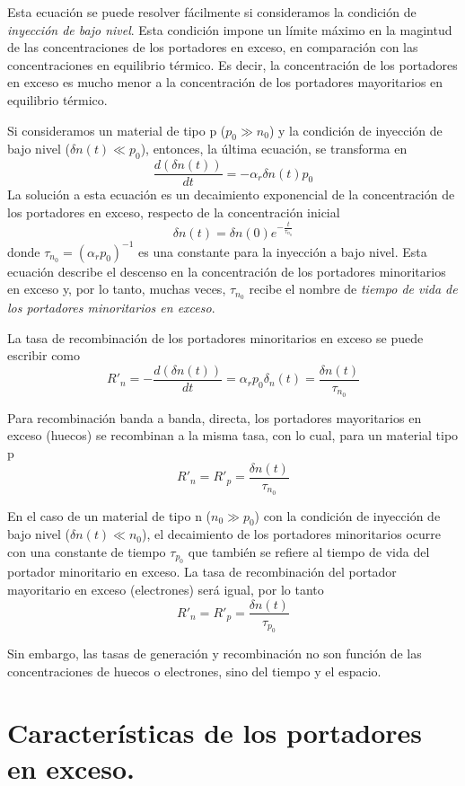 \documentclass[12pt,a4paper]{article}
\begin{document}
Esta ecuación se puede resolver fácilmente si consideramos la condición de \emph{inyección de bajo nivel}. Esta condición impone un límite máximo en la magintud de las concentraciones de los portadores en exceso, en comparación con las concentraciones en equilibrio térmico. Es decir, la concentración de los portadores en exceso es mucho menor a la concentración de los portadores mayoritarios en equilibrio térmico.

Si consideramos un material de tipo p ($p_{0} \gg n_{0}$) y la condición de inyección de bajo nivel ($\delta n(t) \ll p_{0}$), entonces, la última ecuación, se transforma en
\[ \frac{d (\delta n(t))}{dt} = - \alpha _{r} \delta n(t) p_{0} \]
La solución a esta ecuación es un decaimiento exponencial de la concentración de los portadores en exceso, respecto de la concentración inicial
\[ \delta n(t)=\delta n(0) e^{-\frac{t}{\tau _{n_{0}}}} \]
donde $\tau _{n_{0}}=(\alpha _{r}p_{0})^{-1}$ es una constante para la inyección a bajo nivel. Esta ecuación describe el descenso en la concentración de los portadores minoritarios en exceso y, por lo tanto, muchas veces, $\tau _{n_{0}}$ recibe el nombre de \emph{tiempo de vida de los portadores minoritarios en exceso}.

La tasa de recombinación de los portadores minoritarios en exceso se puede escribir como
\[ R'_{n}=-\frac{d(\delta n(t))}{dt} = \alpha _{r} p_{0} \delta _{n}(t) = \frac{\delta n(t)}{\tau _{n_{0}}} \]

Para recombinación banda a banda, directa, los portadores mayoritarios en exceso (huecos) se recombinan a la misma tasa, con lo cual, para un material tipo p
\[ R'_{n}=R'_{p}=\frac{\delta n(t)}{\tau _{n_{0}}} \]

En el caso de un material de tipo n ($n_{0} \gg p_{0}$) con la condición de inyección de bajo nivel ($\delta n(t) \ll n_{0}$), el decaimiento de los portadores minoritarios ocurre con una constante de tiempo $\tau _{p_{0}}$ que también se refiere al tiempo de vida del portador minoritario en exceso. La tasa de recombinación del portador mayoritario en exceso (electrones) será igual, por lo tanto
\[ R'_{n}=R'_{p}=\frac{\delta n(t)}{\tau _{p_{0}}} \]

Sin embargo, las tasas de generación y recombinación no son función de las concentraciones de huecos o electrones, sino del tiempo y el espacio.

\section{Características de los portadores en exceso.}
\end{document}
